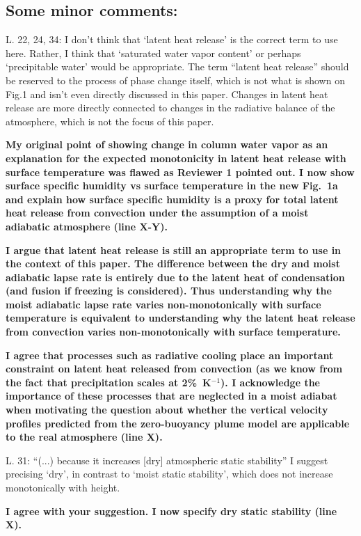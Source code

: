 \documentclass{article}
\begin{document}
\subsection{Some minor comments:}

L. 22, 24, 34: I don't think that `latent heat release' is the correct term to use here. Rather, I think that `saturated water vapor content' or perhaps `precipitable water' would be appropriate. The term ``latent heat release'' should be reserved to the process of phase change itself, which is not what is shown on Fig.1 and isn't even directly discussed in this paper. Changes in latent heat release are more directly connected to changes in the radiative balance of the atmosphere, which is not the focus of this paper.
\par
\textbf{My original point of showing change in column water vapor as an explanation for the expected monotonicity in latent heat release with surface temperature was flawed as Reviewer 1 pointed out. I now show surface specific humidity vs surface temperature in the new Fig.~1a and explain how surface specific humidity is a proxy for total latent heat release from convection under the assumption of a moist adiabatic atmosphere (line X-Y).}
\par
\textbf{I argue that latent heat release is still an appropriate term to use in the context of this paper. The difference between the dry and moist adiabatic lapse rate is entirely due to the latent heat of condensation (and fusion if freezing is considered). Thus understanding why the moist adiabatic lapse rate varies non-monotonically with surface temperature is equivalent to understanding why the latent heat release from convection varies non-monotonically with surface temperature.}
\par
\textbf{I agree that processes such as radiative cooling place an important constraint on latent heat released from convection (as we know from the fact that precipitation scales at 2\%~K$^{-1}$). I acknowledge the importance of these processes that are neglected in a moist adiabat when motivating the question about whether the vertical velocity profiles predicted from the zero-buoyancy plume model are applicable to the real atmosphere (line X).}
\par
L. 31: “(...) because it increases [dry] atmospheric static stability” I suggest precising `dry', in contrast to `moist static stability', which does not increase monotonically with height.
\par
\textbf{I agree with your suggestion. I now specify dry static stability (line X).}
\end{document}

